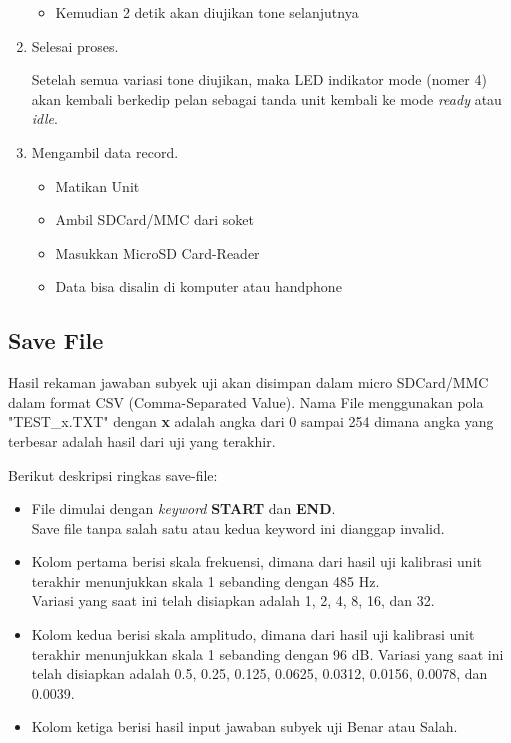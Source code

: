 \documentclass[12pt,]{article}
\begin{document}
\begin{enumerate}
\begin{itemize}
			\item Kemudian 2 detik akan diujikan tone selanjutnya	
		\end{itemize}
		
		\item Selesai proses.
		
		Setelah semua variasi tone diujikan, maka LED indikator mode (nomer 4) akan kembali berkedip pelan sebagai tanda unit kembali ke mode \textit{ready} atau \textit{idle}.
		
		\item Mengambil data record.
		\begin{itemize}
			\item Matikan Unit
			\item Ambil SDCard/MMC dari soket
			\item Masukkan MicroSD Card-Reader
			\item Data bisa disalin di komputer atau handphone
		\end{itemize}
	\end{enumerate}
		
	\newpage
	\subsection{Save File}
	
	Hasil rekaman jawaban subyek uji akan disimpan dalam micro SDCard/MMC dalam format CSV (Comma-Separated Value).
	Nama File menggunakan pola "TEST\_x.TXT" dengan \textbf{x} adalah angka dari 0 sampai 254 dimana angka yang terbesar adalah hasil dari uji yang terakhir.

	Berikut deskripsi ringkas save-file:
	\begin{itemize}
		\item File dimulai dengan \textit{keyword} \textbf{START} dan \textbf{END}.\\
		Save file tanpa salah satu atau kedua keyword ini dianggap invalid.
		
		\item Kolom pertama berisi skala frekuensi, dimana dari hasil uji kalibrasi unit terakhir menunjukkan skala 1 sebanding dengan 485 Hz.\\
		Variasi yang saat ini telah disiapkan adalah 1, 2, 4, 8, 16, dan 32.
		
		\item Kolom kedua berisi skala amplitudo, dimana dari hasil uji kalibrasi unit terakhir menunjukkan skala 1 sebanding dengan 96 dB.
		Variasi yang saat ini telah disiapkan adalah 0.5, 0.25, 0.125, 0.0625, 0.0312, 0.0156, 0.0078, dan 0.0039.
		
		\item Kolom ketiga berisi hasil input jawaban subyek uji Benar atau Salah.
	\end{itemize}
	
\end{document}
